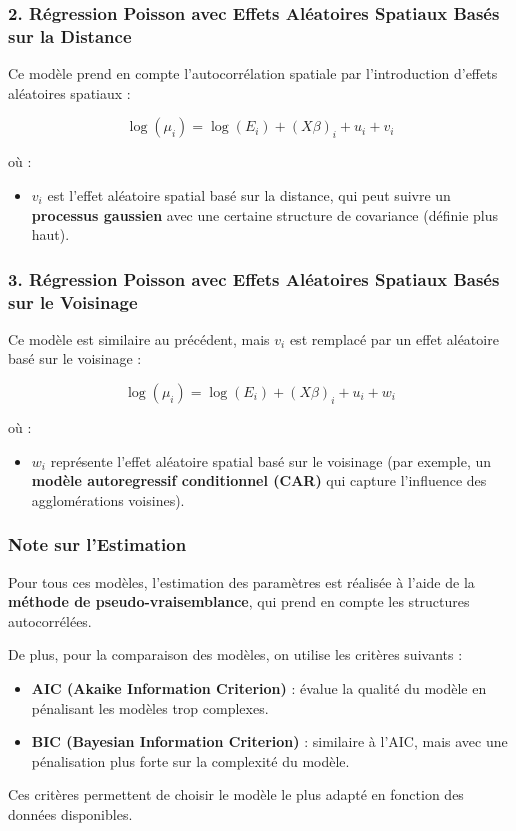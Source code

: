 \documentclass[
]{article}
\providecommand{\tightlist}{%
  \setlength{\itemsep}{0pt}\setlength{\parskip}{0pt}}
\begin{document}
\subsubsection{2. Régression Poisson avec Effets Aléatoires Spatiaux
Basés sur la
Distance}\label{ruxe9gression-poisson-avec-effets-aluxe9atoires-spatiaux-basuxe9s-sur-la-distance}

Ce modèle prend en compte l'autocorrélation spatiale par l'introduction
d'effets aléatoires spatiaux :

\[
\log(\mu_i) = \log(E_i) + (X\beta)_i + u_i + v_i
\]

où :

\begin{itemize}
\tightlist
\item
  \(v_i\) est l'effet aléatoire spatial basé sur la distance, qui peut
  suivre un \textbf{processus gaussien} avec une certaine structure de
  covariance (définie plus haut).
\end{itemize}

\subsubsection{3. Régression Poisson avec Effets Aléatoires Spatiaux
Basés sur le
Voisinage}\label{ruxe9gression-poisson-avec-effets-aluxe9atoires-spatiaux-basuxe9s-sur-le-voisinage}

Ce modèle est similaire au précédent, mais \(v_i\) est remplacé par un
effet aléatoire basé sur le voisinage :

\[
\log(\mu_i) = \log(E_i) + (X\beta)_i + u_i + w_i
\]

où :

\begin{itemize}
\tightlist
\item
  \(w_i\) représente l'effet aléatoire spatial basé sur le voisinage
  (par exemple, un \textbf{modèle autoregressif conditionnel (CAR)} qui
  capture l'influence des agglomérations voisines).
\end{itemize}

\subsubsection{Note sur l'Estimation}\label{note-sur-lestimation}

Pour tous ces modèles, l'estimation des paramètres est réalisée à l'aide
de la \textbf{méthode de pseudo-vraisemblance}, qui prend en compte les
structures autocorrélées.

De plus, pour la comparaison des modèles, on utilise les critères
suivants :

\begin{itemize}
\tightlist
\item
  \textbf{AIC (Akaike Information Criterion)} : évalue la qualité du
  modèle en pénalisant les modèles trop complexes.
\item
  \textbf{BIC (Bayesian Information Criterion)} : similaire à l'AIC,
  mais avec une pénalisation plus forte sur la complexité du modèle.
\end{itemize}

Ces critères permettent de choisir le modèle le plus adapté en fonction
des données disponibles.
\end{document}
